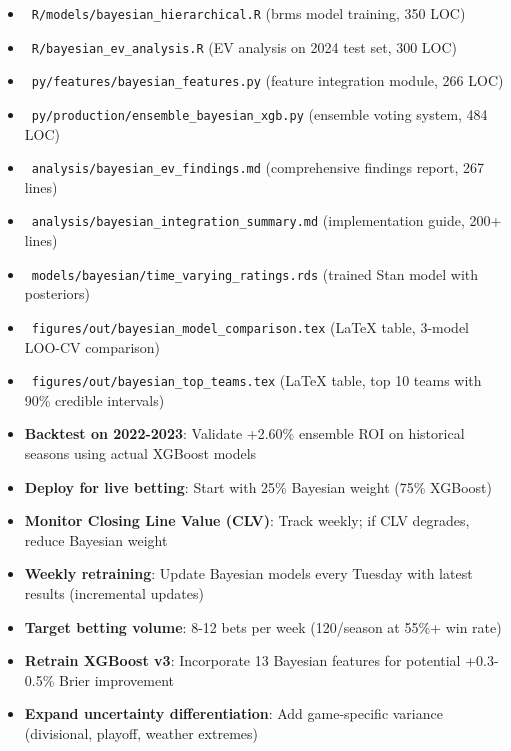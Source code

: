 \begin{itemize}
  \item \done\ \texttt{R/models/bayesian\_hierarchical.R} (brms model training, 350 LOC)
  \item \done\ \texttt{R/bayesian\_ev\_analysis.R} (EV analysis on 2024 test set, 300 LOC)
  \item \done\ \texttt{py/features/bayesian\_features.py} (feature integration module, 266 LOC)
  \item \done\ \texttt{py/production/ensemble\_bayesian\_xgb.py} (ensemble voting system, 484 LOC)
  \item \done\ \texttt{analysis/bayesian\_ev\_findings.md} (comprehensive findings report, 267 lines)
  \item \done\ \texttt{analysis/bayesian\_integration\_summary.md} (implementation guide, 200+ lines)
  \item \done\ \texttt{models/bayesian/time\_varying\_ratings.rds} (trained Stan model with posteriors)
  \item \done\ \texttt{figures/out/bayesian\_model\_comparison.tex} (LaTeX table, 3-model LOO-CV comparison)
  \item \done\ \texttt{figures/out/bayesian\_top\_teams.tex} (LaTeX table, top 10 teams with 90\% credible intervals)
\end{itemize}

\begin{itemize}
  \item {} \textbf{Backtest on 2022-2023}: Validate +2.60\% ensemble ROI on historical seasons using actual XGBoost models
  \item {} \textbf{Deploy for live betting}: Start with 25\% Bayesian weight (75\% XGBoost)
  \item {} \textbf{Monitor Closing Line Value (CLV)}: Track weekly; if CLV degrades, reduce Bayesian weight
  \item {} \textbf{Weekly retraining}: Update Bayesian models every Tuesday with latest results (incremental updates)
  \item {} \textbf{Target betting volume}: 8-12 bets per week (120/season at 55\%+ win rate)
  \item {} \textbf{Retrain XGBoost v3}: Incorporate 13 Bayesian features for potential +0.3-0.5\% Brier improvement
  \item {} \textbf{Expand uncertainty differentiation}: Add game-specific variance (divisional, playoff, weather extremes)
\end{itemize}

